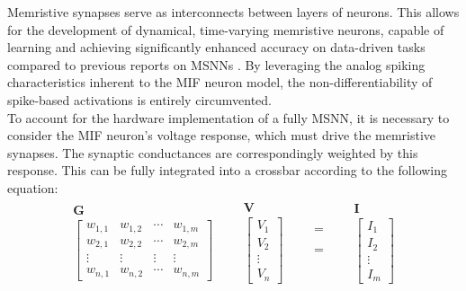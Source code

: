 \noindent Memristive synapses serve as interconnects between layers of neurons. This allows for the development of dynamical, time-varying memristive neurons, capable of learning and achieving significantly enhanced accuracy on data-driven tasks compared to previous reports on MSNNs \cite{neftci2019surrogate}. By leveraging the analog spiking characteristics inherent to the MIF neuron model, the non-differentiability of spike-based activations is entirely circumvented.\\


\noindent To account for the hardware implementation of a fully MSNN, it is necessary to consider the MIF neuron's voltage response, which must drive the memristive synapses. The synaptic conductances are correspondingly weighted by this response. This can be fully integrated into a crossbar according to the following equation:
\begin{align}
\begin{matrix}
& \textbf{G} & \\
& \begin{bmatrix}
    w_{1,1} & w_{1,2} & \cdots & w_{1, m} \\
    w_{2,1} & w_{2,2} & \cdots & w_{2, m} \\
    \vdots & \vdots & \vdots & \vdots \\
    w_{n, 1} & w_{n, 2} & \cdots & w_{n, m}
\end{bmatrix} &\\
\end{matrix}
\begin{matrix}
  & \textbf{V} & \\
 & \begin{bmatrix}
V_{1} \\
V_{2} \\
\vdots \\
V_{n}
\end{bmatrix} &\\
\end{matrix}
\begin{matrix}
 & = & \\
\\
\\
&=&  \\
\\
\end{matrix}
\begin{matrix}
  & \textbf{I} & \\
 & \begin{bmatrix}
I_{1} \\
I_{2} \\
\vdots \\
I_{m}
\end{bmatrix} &\\
\end{matrix}
\label{eq:6.18}
\end{align}


